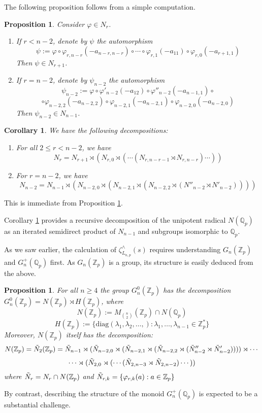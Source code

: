 \documentclass[12pt]{article}
\newtheorem{proposition2}[theorem2]{Proposition}
\newtheorem{corollary2}[theorem2]{Corollary}
\begin{document}
The following proposition follows from a simple computation.
\begin{proposition2}
\label{prop:psi.automorphism}
Consider $\varphi\in{N_{r}}$.
\begin{enumerate}
    \item 
If $r<n-2$, denote by $\psi$ the automorphism \[\psi:=\varphi\circ\varphi_{r,n-r}(-a_{n-r,n-r})\circ\cdots\circ\varphi_{r,1}(-a_{11})\circ\varphi_{r,0}(-a_{r+1,1})\]
Then $\psi\in{N_{r+1}}$.
    \item 
If $r=n-2$, denote by $\psi_{n-2}$ the automorphism \[\psi_{n-2}:=\varphi\circ\varphi'_{n-2}(-a_{12})\circ\varphi''_{n-2}(-a_{n-1,1})\circ\]\[\circ\varphi_{n-2,2}(-a_{n-2,2})\circ\varphi_{n-2,1}(-a_{n-2,1})\circ\varphi_{n-2,0}(-a_{n-2,0})\]
Then $\psi_{n-2}\in{N_{n-1}}$.
\end{enumerate}
\end{proposition2}
\begin{corollary2}
\label{cor:Nr.decomposition}
We have the following decompositions:
\begin{enumerate}
    \item 
For all $2\leq{r}<{n-2}$, we have \[N_{r}=N_{r+1}\rtimes(N_{r,0}\rtimes(\cdots(N_{r,n-r-1}\rtimes{N_{r,n-r}})\cdots))\]
\item For $r=n-2$, we have 
\[N_{n-2}=N_{n-1}\rtimes({N_{n-2,0}}\rtimes(N_{n-2,1}\rtimes(N_{n-2,2}\rtimes(N''_{n-2}\rtimes{N'_{n-2}}))))\]
\end{enumerate}
\end{corollary2}
This is immediate from Proposition \ref{prop:psi.automorphism}.

Corollary \ref{cor:Nr.decomposition} provides a recursive decomposition of the unipotent radical $N(\mathbb{Q}_{p})$ as an iterated semidirect product of $N_{n-1}$ and subgroups isomorphic to $\mathbb{Q}_{p}$.

As we saw earlier, the calculation of $\zeta_{L_{n,p}}^{\wedge}(s)$ requires understanding $G_{n}(\mathbb{Z}_p)$ and $G_{n}^{+}(\mathbb{Q}_p)$ first. As $G_{n}(\mathbb{Z}_{p})$ is a group, its structure is easily deduced from the above.
\begin{proposition2}
\label{prop:G.n.Zp.decomposition}
For all $n\geq{4}$ the group $G_{n}^{0}(\mathbb{Z}_{p})$ has the decomposition $G_{n}^{0}(\mathbb{Z}_{p})=N(\mathbb{Z}_{p})\rtimes{H(\mathbb{Z}_{p})}$, where \[N(\mathbb{Z}_{p}):=M_{\binom{n}{2}}(\mathbb{Z}_{p})\cap{N(\mathbb{Q}_{p})}\]
\[H(\mathbb{Z}_{p}):=\{\mathrm{diag}(\lambda_{1},\lambda_{2},\dots,) : \lambda_1,\dots,\lambda_{n-1}\in\mathbb{Z}_{p}^{\ast}\}\]
Moreover, $N(\mathbb{Z}_{p})$ itself has the decomposition: \[N(\mathbb{Z}_{p})=\Tilde{N}_{2}(\mathbb{Z}_{p})=
\Tilde{N}_{n-1}\rtimes({\Tilde{N}_{n-2,0}}\rtimes(\Tilde{N}_{n-2,1}\rtimes(\Tilde{N}_{n-2,2}\rtimes(\Tilde{N}''_{n-2}\rtimes{\Tilde{N}'_{n-2}}))))\rtimes\cdots\]\[\cdots\rtimes{(\Tilde{N}_{2,0}\rtimes(\cdots(\Tilde{N}_{2,n-3}\rtimes{\Tilde{N}_{2,n-2}})\cdots))}
\]
where $\Tilde{N}_{r}=N_{r}\cap{N(\mathbb{Z}_{p})}$ and $\Tilde{N}_{r,k}=\{\varphi_{r,k}(a) : a\in\mathbb{Z}_{p}\}$
\end{proposition2}
By contrast, describing the structure of the monoid $G_{n}^{+}(\mathbb{Q}_p)$ is expected to be a substantial challenge.
\end{document}
